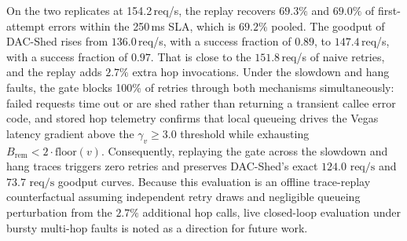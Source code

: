 On the two replicates at 154.2\,req/s, the replay recovers $69.3\%$ and $69.0\%$ of first-attempt errors within the 250\,ms SLA, which is $69.2\%$ pooled. The goodput of DAC-Shed rises from $136.0$\,req/s, with a success fraction of $0.89$, to $147.4$\,req/s, with a success fraction of $0.97$. That is close to the $151.8$\,req/s of naive retries, and the replay adds $2.7\%$ extra hop invocations. Under the slowdown and hang faults, the gate blocks 100\% of retries through both mechanisms simultaneously: failed requests time out or are shed rather than returning a transient callee error code, and stored hop telemetry confirms that local queueing drives the Vegas latency gradient above the $\gamma_v \ge 3.0$ threshold while exhausting $B_{\text{rem}} < 2\cdot\text{floor}(v)$. Consequently, replaying the gate across the slowdown and hang traces triggers zero retries and preserves DAC-Shed's exact $124.0\text{ req/s}$ and $73.7\text{ req/s}$ goodput curves. Because this evaluation is an offline trace-replay counterfactual assuming independent retry draws and negligible queueing perturbation from the $2.7\%$ additional hop calls, live closed-loop evaluation under bursty multi-hop faults is noted as a direction for future work.
